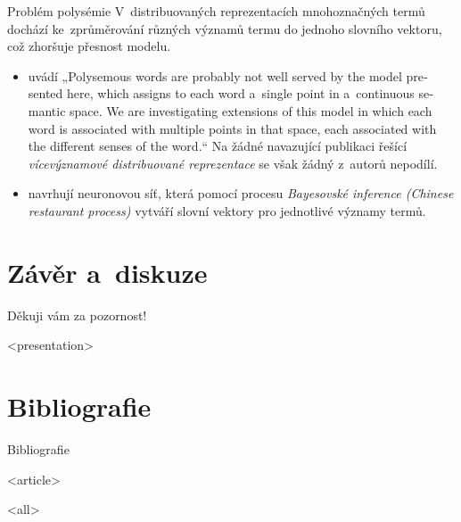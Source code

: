 \begin{frame}{Problém polysémie}
V~distribuovaných reprezentacích mnohoznačných termů dochází ke~zprůměrování
různých významů termu do jednoho slovního vektoru, což zhoršuje přesnost
modelu.

\pause

\begin{itemize}[<+->]
\item\textcite[sekce 5]{bengio03} uvádí „\foreignlanguage{english}{Polysemous words
are probably not well served by the model presented here, which assigns to each
word a~single point in a~continuous semantic space. We are investigating
extensions of this model in which each word is associated with multiple points
in that space, each associated with the different senses of the word.}“ Na
žádné navazující publikaci řešící \emph{vícevýznamové distribuované
reprezentace} se však
žádný z~autorů nepodílí.
\item\textcite{li15} navrhují neuronovou síť, která pomocí procesu \emph{Bayesovské
  inference (Chinese restaurant process)}
   vytváří slovní vektory pro jednotlivé významy termů.
\end{itemize}
\end{frame}

\section{Závěr a~diskuze}

\begin{frame}[plain]
\vfill
\centerline{Děkuji vám za pozornost!}
\vfill\vfill
\end{frame}

\mode
<presentation>

\section{Bibliografie}

\begin{frame}[allowframebreaks]{Bibliografie}
\printbibliography
\end{frame}

\mode
<article>

\printbibliography

\printindex

\mode
<all>
